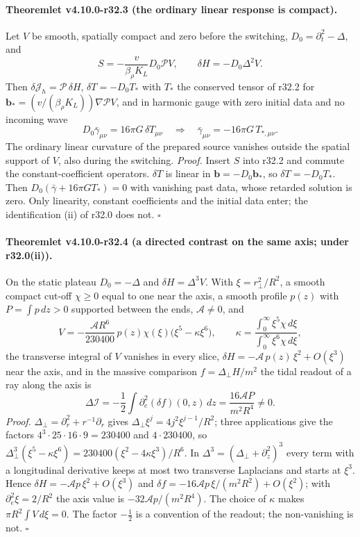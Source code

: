 \paragraph{Theoremlet v4.10.0-r32.3 (the ordinary linear response is compact).}
Let \(V\) be smooth, spatially compact and zero before the switching, \(D_0=\partial_t^2-\Delta\), and
\[
 S=-\frac{v}{\beta_\rho K_L}D_0\mathcal P V,\qquad \delta H=-D_0\Delta^2V .
\]
Then \(\delta\mathcal J_h=\mathcal P\,\delta H\), \(\delta T=-D_0T_*\) with \(T_*\) the conserved tensor of r32.2 for \(\mathbf b_*=(v/(\beta_\rho K_L))\nabla\mathcal PV\), and
in harmonic gauge with zero initial data and no incoming wave
\[
 D_0\bar\gamma_{\mu\nu}=16\pi G\,\delta T_{\mu\nu}\quad\Longrightarrow\quad \bar\gamma_{\mu\nu}=-16\pi G\,T_{*,\mu\nu}.
\]
The ordinary linear curvature of the prepared source vanishes outside the spatial support of \(V\), also during the switching.
\emph{Proof.} Insert \(S\) into r32.2 and commute the constant-coefficient operators.  \(\delta T\) is linear in \(\mathbf b=-D_0\mathbf b_*\), so
\(\delta T=-D_0T_*\).  Then \(D_0(\bar\gamma+16\pi G T_*)=0\) with vanishing past data, whose retarded solution is zero.  Only linearity,
constant coefficients and the initial data enter; the identification (ii) of r32.0 does not.  \(\square\)

\paragraph{Theoremlet v4.10.0-r32.4 (a directed contrast on the same axis; under r32.0(ii)).}
On the static plateau \(D_0=-\Delta\) and \(\delta H=\Delta^3V\).  With \(\xi=r_\perp^2/R^2\), a smooth compact cut-off \(\chi\ge0\) equal to one near the axis,
a smooth profile \(p(z)\) with \(P=\int p\,dz>0\) supported between the ends, \(\mathcal A\neq0\), and
\[
 V=-\frac{\mathcal AR^6}{230400}\,p(z)\chi(\xi)\bigl(\xi^5-\kappa\xi^6\bigr),\qquad
 \kappa=\frac{\int_0^\infty\xi^5\chi\,d\xi}{\int_0^\infty\xi^6\chi\,d\xi},
\]
the transverse integral of \(V\) vanishes in every slice, \(\delta H=-\mathcal A\,p(z)\,\xi^2+O(\xi^3)\) near the axis, and in the massive comparison
\(f=\Delta_\perp H/m^2\) the tidal readout of a ray along the axis is
\[
 \Delta\mathcal I=-\frac12\int\partial_e^2(\delta f)(0,z)\,dz=\frac{16\mathcal AP}{m^2R^4}\neq0 .
\]
\emph{Proof.} \(\Delta_\perp=\partial_r^2+r^{-1}\partial_r\) gives \(\Delta_\perp\xi^j=4j^2\xi^{j-1}/R^2\); three applications give the factors
\(4^3\cdot25\cdot16\cdot9=230400\) and \(4\cdot230400\), so \(\Delta_\perp^3(\xi^5-\kappa\xi^6)=230400(\xi^2-4\kappa\xi^3)/R^6\).  In
\(\Delta^3=(\Delta_\perp+\partial_z^2)^3\) every term with a longitudinal derivative keeps at most two transverse Laplacians and starts at \(\xi^3\).
Hence \(\delta H=-\mathcal Ap\,\xi^2+O(\xi^3)\) and \(\delta f=-16\mathcal Ap\,\xi/(m^2R^2)+O(\xi^2)\); with \(\partial_e^2\xi=2/R^2\) the axis value is
\(-32\mathcal Ap/(m^2R^4)\).  The choice of \(\kappa\) makes \(\pi R^2\int V\,d\xi=0\).  The factor \(-\tfrac12\) is a convention of the readout; the
non-vanishing is not.  \(\square\)

